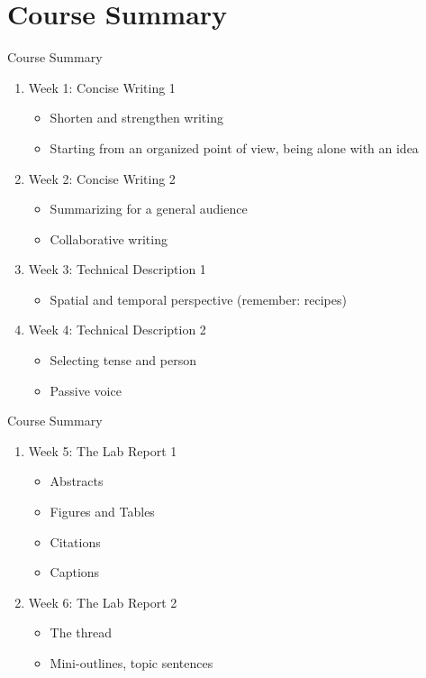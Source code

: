 \documentclass{beamer}
\begin{document}
\section{Course Summary}

\begin{frame}{Course Summary}
\begin{enumerate}
\item Week 1: Concise Writing 1
\begin{itemize}
\item Shorten and strengthen writing
\item Starting from an organized point of view, being alone with an idea
\end{itemize}
\item Week 2: Concise Writing 2
\begin{itemize}
\item Summarizing for a general audience
\item Collaborative writing
\end{itemize}
\item Week 3: Technical Description 1
\begin{itemize}
\item Spatial and temporal perspective (remember: recipes)
\end{itemize}
\item Week 4: Technical Description 2
\begin{itemize}
\item Selecting tense and person
\item Passive voice
\end{itemize}
\end{enumerate}
\end{frame}

\begin{frame}{Course Summary}
\small
\begin{enumerate}
\item Week 5: The Lab Report 1
\begin{itemize}
\item Abstracts
\item Figures and Tables
\item Citations
\item Captions
\end{itemize}
\item Week 6: The Lab Report 2
\begin{itemize}
\item The thread
\item Mini-outlines, topic sentences
\end{itemize}
\end{enumerate}
\end{frame}
\end{document}
